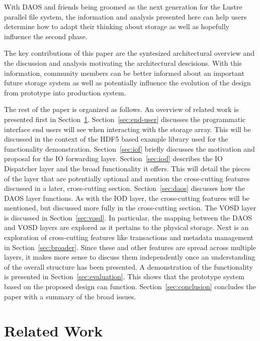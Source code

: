 \documentclass[conference]{IEEEtran} \pdfpagewidth=8.5in
\begin{document}
With DAOS and friends being groomed as the next generation for the Lustre
parallel file system, the information and analysis presented here can help
users determine how to adapt their thinking about storage as well as hopefully
influence the second phase.

The key contributions of this paper are the syntesized architectural overview
and the discussion and analysis motivating the architectural descisions. With
this information, community members can be better informed about an important
future storage system as well as potentially influence the evolution of the
design from prototype into production system.

The rest of the paper is organized as follows. An overview of related work is
presented first in Section~\ref{sec:related}. Section~\ref{sec:end-user}
discusses the programmatic interface end users will see when interacting with
the storage array.  This will be discussed in the context of the HDF5 based
example library used for the functionality demonstration.
Section~\ref{sec:iof} briefly discusses the motivation and proposal for the IO
forwarding layer.  Section~\ref{sec:iod} describes the IO Dispatcher layer and
the broad functionality it offers.  This will detail the pieces of the layer
that are potentially optional and mention the cross-cutting features discussed
in a later, cross-cutting section.  Section~\ref{sec:daos} discusses how the
DAOS layer functions.  As with the IOD layer, the cross-cutting features will
be mentioned, but discussed more fully in the cross-cutting section.  The VOSD
layer is discussed in Section~\ref{sec:vosd}.  In particular, the mapping
between the DAOS and VOSD layers are explored as it pertains to the physical
storage.  Next is an exploration of cross-cutting features like transactions
and metadata management in Section~\ref{sec:broader}.  Since these and other
features are spread across multiple layers, it makes more sense to discuss them
independently once an understanding of the overall structure has been
presented.  A demonstration of the functionality is presented in
Section~\ref{sec:evaluation}.  This shows that the prototype system based on
the proposed design can function.  Section~\ref{sec:conclusion} concludes the
paper with a summary of the broad issues.

\section{Related Work}
\label{sec:related}
\end{document}

